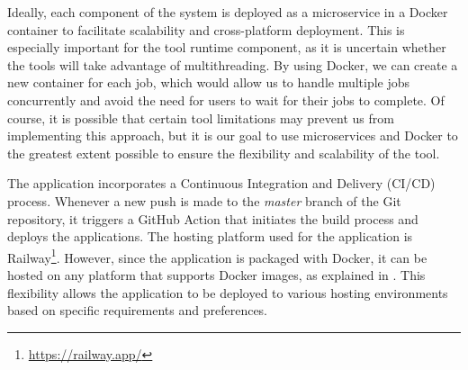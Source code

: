 Ideally, each component of the system is  deployed as a microservice in a
Docker container to facilitate scalability and cross-platform deployment. This
is especially important for the tool runtime component, as it is uncertain
whether the tools will take advantage of multithreading. By using Docker, we
can create a new container for each job, which would allow us to handle
multiple jobs concurrently and avoid the need for users to wait for their jobs
to complete. Of course, it is possible that certain tool limitations may
prevent us from implementing this approach, but it is our goal to use
microservices and Docker to the greatest extent possible to ensure the
flexibility and scalability of the tool.

The application incorporates a Continuous Integration and Delivery (CI/CD)
process. Whenever a new push is made to the \textit{master} branch of the Git
repository, it triggers a GitHub Action that initiates the build process and
deploys the applications. The hosting platform used for the application is
Railway\footnote{\url{https://railway.app/}}. However, since the application is
packaged with Docker, it can be hosted on any platform that supports Docker
images, as explained in . This flexibility allows the
application to be deployed to various hosting environments based on specific
requirements and preferences.
